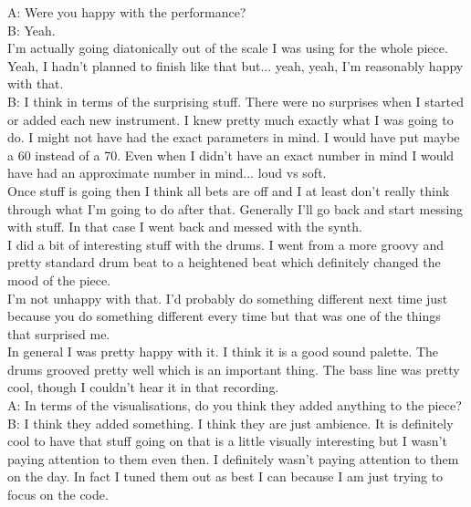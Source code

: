 A: Were you happy with the performance?\\

B: Yeah.\\

I'm actually going diatonically out of the scale I was using for the whole piece.\\

Yeah, I hadn't planned to finish like that but... yeah, yeah, I'm reasonably happy with that.\\

B: I think in terms of the surprising stuff. There were no surprises when I started or added each new instrument. I knew pretty much exactly what I was going to do. I might not have had the exact parameters in mind. I would have put maybe a 60 instead of a 70. Even when I didn't have an exact number in mind I would have had an approximate number in mind... loud vs soft.\\

Once stuff is going then I think all bets are off and I at least don't really think through what I'm going to do after that. Generally I'll go back and start messing with stuff. In that case I went back and messed with the synth.\\

I did a bit of interesting stuff with the drums. I went from a more groovy and pretty standard drum beat to a heightened beat which definitely changed the mood of the piece.\\

I'm not unhappy with that. I'd probably do something different next time just because you do something different every time but that was one of the things that surprised me.\\

In general I was pretty happy with it. I think it is a good sound palette. The drums grooved pretty well which is an important thing. The bass line was pretty cool, though I couldn't hear it in that recording.\\

A: In terms of the visualisations, do you think they added anything to the piece?\\

B: I think they added something. I think they are just ambience. It is definitely cool to have that stuff going on that is a little visually interesting but I wasn't paying attention to them even then. I definitely wasn't paying attention to them on the day. In fact I tuned them out as best I can because I am just trying to focus on the code.\\

